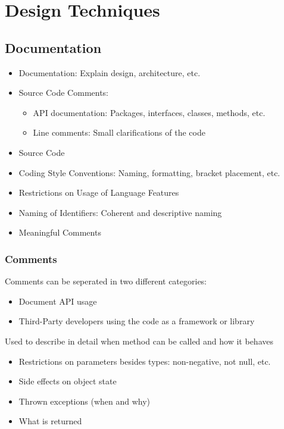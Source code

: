 \documentclass[
../../Software_Engineering_Summary.tex,
]
{subfiles}
\begin{document}
\section{Design Techniques}
\subsection{Documentation}

\begin{defbox}
    [Readability]
    \begin{itemize}
        \item Documentation: Explain design, architecture, etc.
        \item Source Code Comments: 
        \begin{itemize}
            \item API documentation: Packages, interfaces, classes, methods, etc.
            \item Line comments: Small clarifications of the code
        \end{itemize}
        \item Source Code
    \end{itemize}
\end{defbox}

\begin{defbox}
    \begin{itemize}
        \item Coding Style Conventions: Naming, formatting, bracket placement, etc.
        \item Restrictions on Usage of Language Features
        \item Naming of Identifiers: Coherent and descriptive naming
        \item Meaningful Comments
    \end{itemize}
\end{defbox}

\subsubsection{Comments}
Comments can be seperated in two different categories:

\begin{defbox}
    \begin{itemize}
        \item {} Document API usage
        \item {} Third-Party developers using the code as a framework or library
    \end{itemize}
    Used to describe in detail when method can be called and how it behaves

    \begin{itemize}
        \item Restrictions on parameters besides types: non-negative, not null, etc.
        \item Side effects on object state
        \item Thrown exceptions (when and why)
        \item What is returned
    \end{itemize}
\end{defbox}
\end{document}
